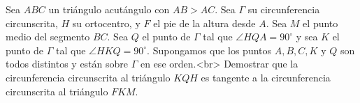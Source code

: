 Sea $ABC$ un triángulo acutángulo con $AB\gt AC$. Sea $\Gamma$ su circunferencia circunscrita, $H$ su ortocentro, y $F$ el pie de la altura desde $A$. Sea $M$ el punto medio del segmento $BC$. Sea $Q$ el punto de $\Gamma$ tal que $\angle HQA = 90^{\circ}$ y sea $K$ el punto de $\Gamma$ tal que $\angle HKQ = 90^{\circ}$. Supongamos que los puntos $A,B,C,K$ y $Q$ son todos distintos y están sobre $\Gamma$ en ese orden.<br>
Demostrar que la circunferencia circunscrita al triángulo $KQH$ es tangente a la circunferencia circunscrita al triángulo $FKM$.
